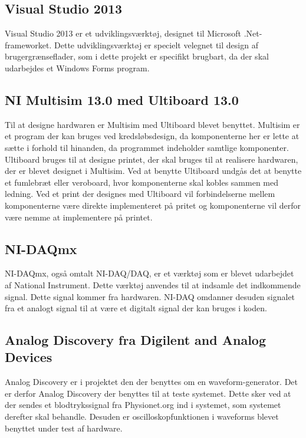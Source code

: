 \subsection{Visual Studio 2013}
Visual Studio 2013 er et udviklingsværktøj, designet til Microsoft .Net-frameworket. Dette udviklingsværktøj er specielt velegnet til design af brugergrænseflader, som i dette projekt er specifikt brugbart, da der skal udarbejdes et Windows Forms program.
\subsection{NI Multisim 13.0 med Ultiboard 13.0}
Til at designe hardwaren er Multisim med Ultiboard blevet benyttet. Multisim er et program der kan bruges ved kredsløbsdesign, da komponenterne her er lette at sætte i forhold til hinanden, da programmet indeholder samtlige komponenter. Ultiboard bruges til at designe printet, der skal bruges til at realisere hardwaren, der er blevet designet i Multisim. Ved at benytte Ultiboard undgås det at benytte et fumlebræt eller veroboard, hvor komponenterne skal kobles sammen med ledning. Ved et print der designes med Ultiboard vil forbindelserne mellem komponenterne være direkte implementeret på pritet og komponenterne vil derfor være nemme at implementere på printet.
\subsection{NI-DAQmx}
NI-DAQmx, også omtalt NI-DAQ/DAQ, er et værktøj som er blevet udarbejdet af National Instrument. Dette værktøj anvendes til at indsamle det indkommende signal. Dette signal kommer fra hardwaren. NI-DAQ omdanner desuden signalet fra et analogt signal til at være et digitalt signal der kan bruges i koden. 
\subsection{Analog Discovery fra Digilent and Analog Devices}
Analog Discovery er i projektet den der benyttes om en waveform-generator. Det er derfor Analog Discovery der benyttes til at teste systemet. Dette sker ved at der sendes et blodtrykssignal fra Physionet.org ind i systemet, som systemet derefter skal behandle. Desuden er oscilloskopfunktionen i waveforms blevet benyttet under test af hardware.
